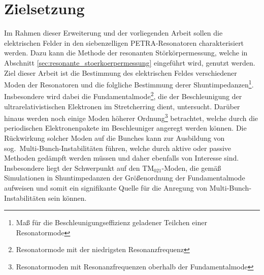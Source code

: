 \section{Zielsetzung}
Im Rahmen dieser Erweiterung und der vorliegenden Arbeit sollen die elektrischen Felder in den siebenzelligen PETRA-Resonatoren charakterisiert werden.
Dazu kann die Methode der resonanten Störkörpermessung, welche in Abschnitt \ref{sec:resonante_stoerkoerpermessung} eingeführt wird, genutzt werden.
Ziel dieser Arbeit ist die Bestimmung des elektrischen Feldes verschiedener Moden der Resonatoren und die folgliche Bestimmung derer Shuntimpedanzen\footnote{Maß für die Beschleunigungseffizienz geladener Teilchen einer Resonatormode}.
Insbesondere wird dabei die Fundamentalmode\footnote{Resonatormode mit der niedrigsten Resonanzfrequenz}, die der Beschleunigung der ultrarelativistischen Elektronen im Stretcherring dient, untersucht.
Darüber hinaus werden noch einige Moden höherer Ordnung\footnote{Resonatormoden mit Resonanzfrequenzen oberhalb der Fundamentalmode} betrachtet, welche durch die periodischen Elektronenpakete im Beschleuniger angeregt werden können.
Die Rückwirkung solcher Moden auf die Bunches kann zur Ausbildung von sog.\ Multi-Bunch-Instabilitäten führen, welche durch aktive oder passive Methoden gedämpft werden müssen und daher ebenfalls von Interesse sind.
Insbesondere liegt der Schwerpunkt auf den $\mathrm{TM}_{021}$-Moden, die gemäß Simulationen in \cite{schedler} Shuntimpedanzen der Größenordnung der Fundamentalmode aufweisen und somit ein signifikante Quelle für die Anregung von Multi-Bunch-Instabilitäten sein können.
